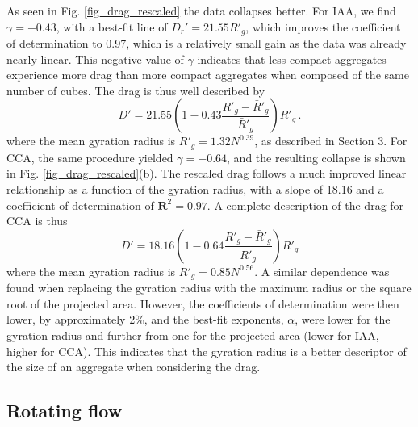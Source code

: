 As seen in Fig. \ref{fig_drag_rescaled} the data collapses better. For IAA, we find $\gamma = -0.43$, with a best-fit line of  $D_r' = 21.55 R'_g$, which improves the coefficient of determination to 0.97, which is a relatively small gain as the data was already nearly linear. This negative value of $\gamma$ indicates that less compact aggregates experience more drag than more compact aggregates when composed of the same number of cubes.
The drag is thus well described by
\begin{equation}
D' = 21.55 \left(1 - 0.43  \frac{R'_g - \bar{R}'_g}{\bar{R}'_g}\right )  R'_g \, . 
\label{eq_drag_rescaledIAA}
\end{equation}
where the mean gyration radius is $\bar{R}'_g = 1.32N^{0.39}$, as described in Section 3.
For CCA,  the same procedure yielded $\gamma = -0.64$, and the resulting collapse is shown in Fig. \ref{fig_drag_rescaled}(b).
The rescaled drag follows a much improved linear relationship as a function of the gyration radius, with a slope of 18.16 and a coefficient of determination of $\mathbf{R}^2=0.97$. A complete description of the drag for CCA is thus
\begin{equation}
D' = 18.16 \left(1 -0.64  \frac{R'_g - \bar{R}'_g}{\bar{R}'_g}\right) R'_g
\label{eq_drag_rescaledCCA}
\end{equation}
where the mean gyration radius is $\bar{R}'_g = 0.85N^{0.56}$.  
A similar dependence was found when replacing the gyration radius with the maximum radius or the square root of the projected area. However, the coefficients of determination were then lower, by approximately 2\%, and the best-fit exponents, $\alpha$, were lower for the gyration radius and further from one for the projected area (lower for IAA, higher for CCA). This indicates that the gyration radius is a better descriptor of the size of an aggregate when considering the drag.

\subsection{Rotating flow}

